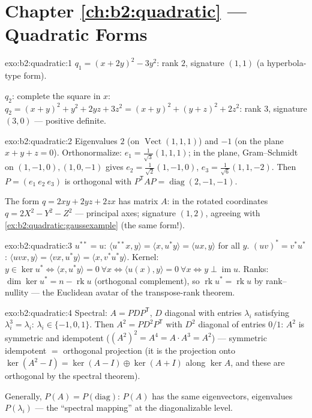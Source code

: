 \section*{Chapter \ref{ch:b2:quadratic} --- Quadratic Forms}

\begin{solution}{exo:b2:quadratic:1}
$q_1 = (x + 2y)^2 - 3y^2$: rank $2$, signature $(1, 1)$ (a
hyperbola-type form).

$q_2$: complete the square in $x$: $q_2 = (x + y)^2 + y^2 + 2yz +
3z^2 = (x+y)^2 + (y + z)^2 + 2z^2$: rank $3$, signature $(3, 0)$
--- positive definite.
\end{solution}

\begin{solution}{exo:b2:quadratic:2}
Eigenvalues $2$ (on $\operatorname{Vect}(1,1,1)$) and $-1$ (on the
plane $x + y + z = 0$). Orthonormalize: $e_1 =
\frac{1}{\sqrt3}(1,1,1)$; in the plane, Gram--Schmidt on $(1,-1,0),
(1,0,-1)$ gives $e_2 = \frac{1}{\sqrt2}(1,-1,0)$, $e_3 =
\frac{1}{\sqrt6}(1,1,-2)$. Then $P = (e_1\ e_2\ e_3)$ is orthogonal
with $P^{\mathsf T}AP = \operatorname{diag}(2,-1,-1)$.

The form $q = 2xy + 2yz + 2zx$ has matrix $A$: in the rotated
coordinates $q = 2X^2 - Y^2 - Z^2$ --- principal axes; signature
$(1,2)$, agreeing with \cref{ex:b2:quadratic:gaussexample}
(the same form!).
\end{solution}

\begin{solution}{exo:b2:quadratic:3}
$u^{**} = u$: $\langle u^{**}x, y\rangle = \langle x, u^*y\rangle =
\langle ux, y\rangle$ for all $y$. $(uv)^* = v^*u^*$: $\langle
uvx, y\rangle = \langle vx, u^*y\rangle = \langle x,
v^*u^*y\rangle$. Kernel: $y \in \ker u^* \iff \langle x, u^*y
\rangle = 0\ \forall x \iff \langle u(x), y\rangle = 0\ \forall x
\iff y \perp \operatorname{im} u$. Ranks: $\dim\ker u^* = n -
\operatorname{rk} u$ (orthogonal complement), so
$\operatorname{rk} u^* = \operatorname{rk} u$ by rank--nullity ---
the Euclidean avatar of the transpose-rank theorem.
\end{solution}

\begin{solution}{exo:b2:quadratic:4}
Spectral: $A = PDP^{\mathsf T}$, $D$ diagonal with entries
$\lambda_i$ satisfying $\lambda_i^3 = \lambda_i$: $\lambda_i \in
\{-1, 0, 1\}$. Then $A^2 = PD^2P^{\mathsf T}$ with $D^2$ diagonal
of entries $0/1$: $A^2$ is symmetric and idempotent
($(A^2)^2 = A^4 = A\cdot A^3 = A^2$) --- symmetric idempotent
$=$ orthogonal projection (it is the projection onto
$\ker(A^2 - I) = \ker(A-I)\oplus\ker(A+I)$ along $\ker A$, and
these are orthogonal by the spectral theorem).

Generally, $P(A) = P\!\left(\text{diag}\right)$: $P(A)$ has the
same eigenvectors, eigenvalues $P(\lambda_i)$ --- the ``spectral
mapping'' at the diagonalizable level.
\end{solution}

